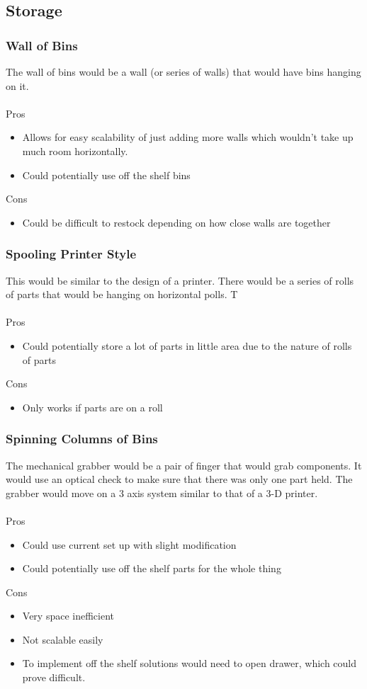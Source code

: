 \documentclass[12pt]{report}
\begin{document}
\subsection*{Storage}

\subsubsection*{Wall of Bins}
The wall of bins would be a wall (or series of walls) that would have bins hanging on it.  \\ \\
Pros
\begin{itemize}
\item Allows for easy scalability of just adding more walls which wouldn't take up much room horizontally.
\item Could potentially use off the shelf bins
\end{itemize}
Cons
\begin{itemize}
\item Could be difficult to restock depending on how close walls are together
\end{itemize}

\subsubsection*{Spooling Printer Style}
This would be similar to the design of a printer. There would be a series of rolls of parts that would be hanging on horizontal polls. T\\ \\
Pros
\begin{itemize}
\item Could potentially store a lot of parts in little area due to the nature of rolls of parts
\end{itemize}
Cons
\begin{itemize}
\item Only works if parts are on a roll
\end{itemize}

\subsubsection*{Spinning Columns of Bins}
The mechanical grabber would be a pair of finger that would grab components. It would use an optical check to make sure that there was only one part held. The grabber would move on a 3 axis system similar to that of a 3-D printer. \\ \\
Pros
\begin{itemize}
\item Could use current set up with slight modification
\item Could potentially use off the shelf parts for the whole thing
\end{itemize}
Cons
\begin{itemize}
\item Very space inefficient
\item Not scalable easily
\item To implement off the shelf solutions would need to open drawer, which could prove difficult.
\end{itemize}
\end{document}

